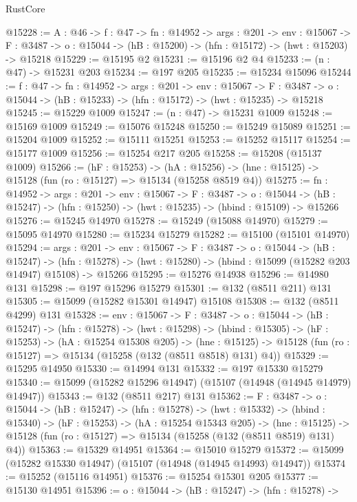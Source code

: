 \begin{lexlean}{RustCore}
\begin{coremodule}
@15228 := {A : @46} ->
  {f : @47} ->
  {fn : @14952} ->
  {args : @201} ->
  {env : @15067} ->
  {F : @3487} -> {o : @15044} -> (hB : @15200) -> (hfn : @15172) -> (hwt : @15203) -> @15218
@15229 := @15195 @2
@15231 := @15196 @2 @4
@15233 := (n : @47) -> @15231 @203
@15234 := @197 @205
@15235 := @15234 @15096
@15244 := {f : @47} ->
  {fn : @14952} ->
  {args : @201} ->
  {env : @15067} ->
  {F : @3487} -> {o : @15044} -> (hB : @15233) -> (hfn : @15172) -> (hwt : @15235) -> @15218
@15245 := @15229 @1009
@15247 := (n : @47) -> @15231 @1009
@15248 := @15169 @1009
@15249 := @15076 @15248
@15250 := @15249 @15089
@15251 := @15204 @1009
@15252 := @15111 @15251
@15253 := @15252 @15117
@15254 := @15177 @1009
@15256 := @15254 @217 @205
@15258 := @15208 (@15137 @1009)
@15266 := (hF : @15253) ->
  (hA : @15256) -> (hne : @15125) -> @15128 (fun (ro : @15127) => @15134 (@15258 @8519 @4))
@15275 := {fn : @14952} ->
  {args : @201} ->
  {env : @15067} ->
  {F : @3487} ->
  {o : @15044} -> (hB : @15247) -> (hfn : @15250) -> (hwt : @15235) -> (hbind : @15109) -> @15266
@15276 := @15245 @14970
@15278 := @15249 (@15088 @14970)
@15279 := @15095 @14970
@15280 := @15234 @15279
@15282 := @15100 (@15101 @14970)
@15294 := {args : @201} ->
  {env : @15067} ->
  {F : @3487} ->
  {o : @15044} ->
  (hB : @15247) ->
  (hfn : @15278) -> (hwt : @15280) -> (hbind : @15099 (@15282 @203 @14947) @15108) -> @15266
@15295 := @15276 @14938
@15296 := @14980 @131
@15298 := @197 @15296 @15279
@15301 := @132 (@8511 @211) @131
@15305 := @15099 (@15282 @15301 @14947) @15108
@15308 := @132 (@8511 @4299) @131
@15328 := {env : @15067} ->
  {F : @3487} ->
  {o : @15044} ->
  (hB : @15247) ->
  (hfn : @15278) ->
  (hwt : @15298) ->
  (hbind : @15305) ->
  (hF : @15253) ->
  (hA : @15254 @15308 @205) ->
  (hne : @15125) -> @15128 (fun (ro : @15127) => @15134 (@15258 (@132 (@8511 @8518) @131) @4))
@15329 := @15295 @14950
@15330 := @14994 @131
@15332 := @197 @15330 @15279
@15340 := @15099 (@15282 @15296 @14947) (@15107 (@14948 (@14945 @14979) @14947))
@15343 := @132 (@8511 @217) @131
@15362 := {F : @3487} ->
  {o : @15044} ->
  (hB : @15247) ->
  (hfn : @15278) ->
  (hwt : @15332) ->
  (hbind : @15340) ->
  (hF : @15253) ->
  (hA : @15254 @15343 @205) ->
  (hne : @15125) -> @15128 (fun (ro : @15127) => @15134 (@15258 (@132 (@8511 @8519) @131) @4))
@15363 := @15329 @14951
@15364 := @15010 @15279
@15372 := @15099 (@15282 @15330 @14947) (@15107 (@14948 (@14945 @14993) @14947))
@15374 := @15252 (@15116 @14951)
@15376 := @15254 @15301 @205
@15377 := @15130 @14951
@15396 := {o : @15044} ->
  (hB : @15247) ->
  (hfn : @15278) ->

\end{coremodule}
\end{lexlean}
